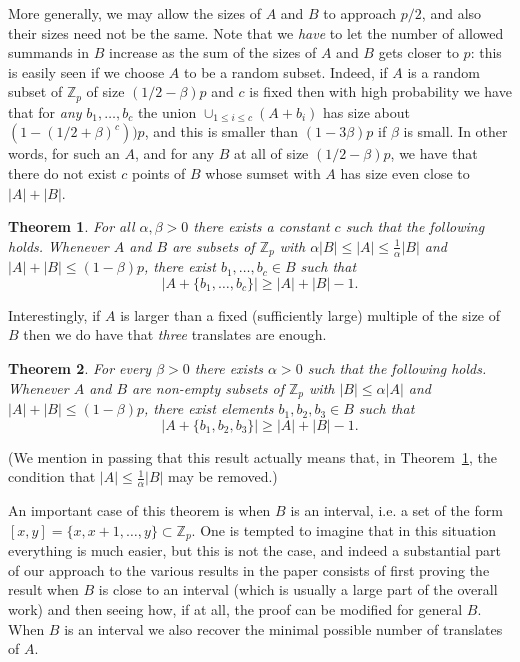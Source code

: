 \documentclass[12pt,reqno]{amsart}
\newtheorem{theorem}{Theorem}
\theoremstyle{definition}
\renewcommand\leq{\leqslant}
\renewcommand\geq{\geqslant}
\renewcommand\ge{\geqslant}
\begin{document}
\vspace{5pt}
More generally, we may allow the sizes of $A$ and $B$ to approach $p/2$, and also their sizes need
not be the same. Note that we {\em have} to let the number of allowed summands in $B$ increase as
the sum of the sizes of $A$ and
$B$ gets closer to $p$: this is easily seen if we choose $A$ to be a random subset.
Indeed, if $A$ is a random subset of $\mathbb{Z}_p$ of size $(1/2 - \beta) p$ and $c$ is fixed then
with high probability we have that for {\em any} $b_1, \hdots, b_c$ the union
$\cup_{1\leq i\leq c}(A+b_i)$ has size about $(1-(1/2 + \beta)^c))p$, and this is smaller than
$(1-3\beta)p$ if $\beta$ is small. In other words, for such an $A$, and for any $B$ at all of size
$(1/2 - \beta) p$, we have that there do not exist $c$ points of $B$ whose sumset with $A$ has size
even close to $|A| + |B|$.


\begin{theorem}\label{translates_of_A_Zp}
For all $\alpha, \beta >0$ there exists a constant $c$ such that the
following holds. Whenever $A$ and $B$ are subsets of $\mathbb{Z}_p$ with
$\alpha |B| \leq |A| \leq \frac{1}{\alpha}|B|$ and $|A|+|B| \leq (1-\beta)p$, there
exist $b_1, \hdots, b_c \in B$ such that
\[
|A+\{b_1, \hdots, b_c\} |\geq |A|+|B|-1.
\]
\end{theorem}

\vspace{5pt}
Interestingly, if $A$ is larger than a fixed (sufficiently large) multiple
of the size of $B$ then we do have that
{\em three} translates are enough.\\

\begin{theorem}\label{intro_general_three_translates_Zp}
For every $\beta>0$ there exists $\alpha>0$ such that the following holds.
Whenever $A$ and $B$ are non-empty subsets of
$\mathbb{Z}_p$ with $|B| \leq \alpha |A|$ and $|A|+|B| \leq (1-\beta)p$,
there exist
elements $b_1,b_2,b_3 \in B$ such that
$$|A+\{b_1, b_2,b_3\}| \ge |A|+|B|-1.$$
\end{theorem}

(We mention in passing that this result actually means that, in Theorem~\ref{translates_of_A_Zp}, the condition
that $|A| \leq \frac{1}{\alpha}|B|$ may be removed.)

\vspace{5pt}
An important case of this theorem is when $B$ is an interval, i.e. a set of the form $[x,y]= \{x, x+1, \dots , y\} \subset {\mathbb Z}_p$.
One is tempted to imagine that in this situation everything is much easier, but this is not the case,
and indeed a substantial part of our approach to the
various results in the paper consists of first proving the result when $B$ is close to an interval
(which is usually a large part of the overall work) and then seeing how, if at all, the proof
can be modified for general $B$. When $B$ is an interval we also recover the minimal possible number of
translates of $A$.
\end{document}
